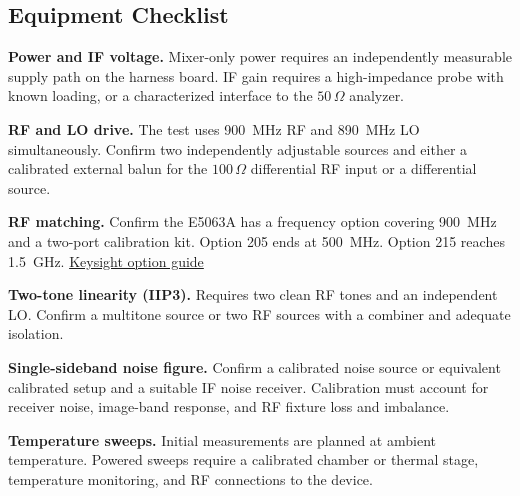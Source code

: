 \documentclass[11pt,letterpaper]{article}
\begin{document}
\subsection*{Equipment Checklist}

\textbf{Power and IF voltage.}
Mixer-only power requires an independently measurable supply path on the harness board.
IF gain requires a high-impedance probe with known loading, or a characterized interface to the \(50\,\Omega\) analyzer.

\textbf{RF and LO drive.}
The test uses 900~MHz RF and 890~MHz LO simultaneously.
Confirm two independently adjustable sources and either a calibrated external balun for the \(100\,\Omega\) differential RF input or a differential source.

\textbf{RF matching.}
Confirm the E5063A has a frequency option covering 900~MHz and a two-port calibration kit.
Option 205 ends at 500~MHz. Option 215 reaches 1.5~GHz.
\href{https://helpfiles.keysight.com/csg/e5063a/product_information/options.htm}{Keysight option guide}

\textbf{Two-tone linearity (IIP3).}
Requires two clean RF tones and an independent LO.
Confirm a multitone source or two RF sources with a combiner and adequate isolation.

\textbf{Single-sideband noise figure.}
Confirm a calibrated noise source or equivalent calibrated setup and a suitable IF noise receiver.
Calibration must account for receiver noise, image-band response, and RF fixture loss and imbalance.

\textbf{Temperature sweeps.}
Initial measurements are planned at ambient temperature.
Powered sweeps require a calibrated chamber or thermal stage, temperature monitoring, and RF connections to the device.

\end{document}
